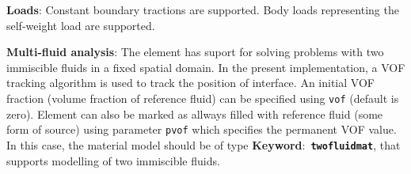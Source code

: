 \documentclass[a4paper]{article}
\newcommand{\descitem}[1]{{\noindent \bf #1}:}
\newcommand{\elemkeyword}[1]{\descitem{Keyword}~{\bf \texttt{#1}}}
\newcommand{\param}[1]{{\texttt{#1}}}
\begin{document}
\descitem{Loads} Constant boundary tractions are supported. Body loads
representing the self-weight load are supported.

\descitem{Multi-fluid analysis} The element has suport for solving
problems with two immiscible fluids in
a fixed spatial domain. In the present implementation, a VOF tracking algorithm
is used to track the position of interface. An initial VOF fraction
(volume fraction of reference fluid) can be specified using
\param{vof} (default is zero). Element can also be marked as allways
filled with reference fluid (some form of source) using parameter
\param{pvof} which specifies the permanent VOF value. In this case,
the material model should be of type \elemkeyword{twofluidmat}, that
supports modelling of two immiscible fluids.
\end{document}

